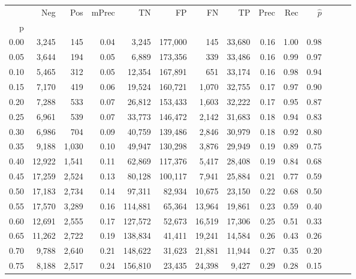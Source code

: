 \begin{tabular}{rrrrrrrrrrrrrr}
\toprule
{} &     Neg &    Pos & mPrec &       TN &       FP &      FN &      TP &  Prec &   Rec & $\hat{p}$ \\
p    &         &        &       &          &          &         &         &       &       &           \\
\midrule
0.00 &   3,245 &    145 &  0.04 &    3,245 &  177,000 &     145 &  33,680 &  0.16 &  1.00 &      0.98 \\
0.05 &   3,644 &    194 &  0.05 &    6,889 &  173,356 &     339 &  33,486 &  0.16 &  0.99 &      0.97 \\
0.10 &   5,465 &    312 &  0.05 &   12,354 &  167,891 &     651 &  33,174 &  0.16 &  0.98 &      0.94 \\
0.15 &   7,170 &    419 &  0.06 &   19,524 &  160,721 &   1,070 &  32,755 &  0.17 &  0.97 &      0.90 \\
0.20 &   7,288 &    533 &  0.07 &   26,812 &  153,433 &   1,603 &  32,222 &  0.17 &  0.95 &      0.87 \\
0.25 &   6,961 &    539 &  0.07 &   33,773 &  146,472 &   2,142 &  31,683 &  0.18 &  0.94 &      0.83 \\
0.30 &   6,986 &    704 &  0.09 &   40,759 &  139,486 &   2,846 &  30,979 &  0.18 &  0.92 &      0.80 \\
0.35 &   9,188 &  1,030 &  0.10 &   49,947 &  130,298 &   3,876 &  29,949 &  0.19 &  0.89 &      0.75 \\
0.40 &  12,922 &  1,541 &  0.11 &   62,869 &  117,376 &   5,417 &  28,408 &  0.19 &  0.84 &      0.68 \\
0.45 &  17,259 &  2,524 &  0.13 &   80,128 &  100,117 &   7,941 &  25,884 &  0.21 &  0.77 &      0.59 \\
0.50 &  17,183 &  2,734 &  0.14 &   97,311 &   82,934 &  10,675 &  23,150 &  0.22 &  0.68 &      0.50 \\
0.55 &  17,570 &  3,289 &  0.16 &  114,881 &   65,364 &  13,964 &  19,861 &  0.23 &  0.59 &      0.40 \\
0.60 &  12,691 &  2,555 &  0.17 &  127,572 &   52,673 &  16,519 &  17,306 &  0.25 &  0.51 &      0.33 \\
0.65 &  11,262 &  2,722 &  0.19 &  138,834 &   41,411 &  19,241 &  14,584 &  0.26 &  0.43 &      0.26 \\
0.70 &   9,788 &  2,640 &  0.21 &  148,622 &   31,623 &  21,881 &  11,944 &  0.27 &  0.35 &      0.20 \\
0.75 &   8,188 &  2,517 &  0.24 &  156,810 &   23,435 &  24,398 &   9,427 &  0.29 &  0.28 &      0.15 \\

\end{tabular}
